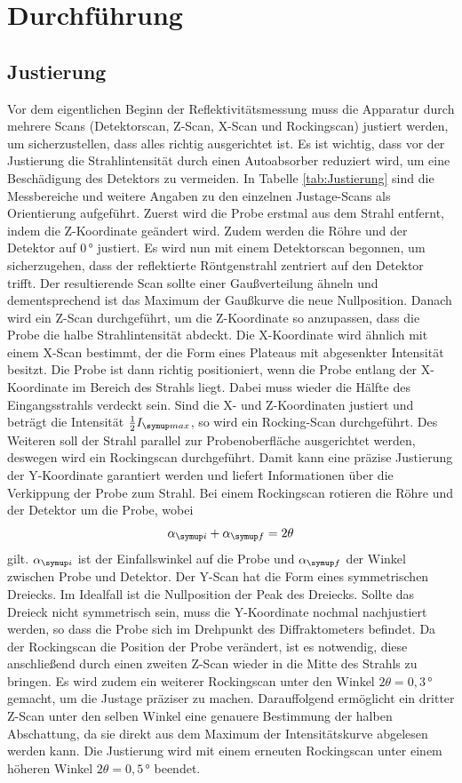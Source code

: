 \section{Durchführung}
\subsection{Justierung}
Vor dem eigentlichen Beginn der Reflektivitätsmessung muss die Apparatur durch mehrere Scans 
(Detektorscan, Z-Scan, X-Scan und Rockingscan) justiert werden, 
um sicherzustellen, dass alles richtig ausgerichtet ist.
Es ist wichtig, dass vor der Justierung die Strahlintensität durch einen Autoabsorber reduziert wird, um 
eine Beschädigung des Detektors zu vermeiden.
In Tabelle \ref{tab:Justierung} sind die Messbereiche und weitere Angaben zu den einzelnen Justage-Scans als Orientierung aufgeführt.
Zuerst wird die Probe erstmal aus dem Strahl entfernt, indem die Z-Koordinate geändert wird. Zudem werden die 
Röhre und der Detektor auf 0\,° justiert.
Es wird nun mit einem Detektorscan begonnen, um sicherzugehen, dass der reflektierte Röntgenstrahl zentriert auf den Detektor trifft.
Der resultierende Scan sollte einer Gaußverteilung ähneln und dementsprechend ist das Maximum der Gaußkurve die neue Nullposition.
Danach wird ein Z-Scan durchgeführt, um die Z-Koordinate so anzupassen, dass die Probe die halbe Strahlintensität abdeckt.
Die X-Koordinate wird ähnlich mit einem X-Scan bestimmt, der die Form eines Plateaus mit abgesenkter Intensität besitzt. 
Die Probe ist dann richtig positioniert, wenn die Probe entlang der X-Koordinate 
im Bereich des Strahls liegt. Dabei muss wieder die Hälfte des Eingangsstrahls verdeckt sein.
Sind die X- und Z-Koordinaten justiert und beträgt die Intensität $\frac{1}{2} I\idx{max}$, so wird ein Rocking-Scan durchgeführt.
Des Weiteren soll der Strahl parallel zur Probenoberfläche ausgerichtet werden, deswegen wird ein Rockingscan durchgeführt.
Damit kann eine präzise Justierung der Y-Koordinate garantiert werden und liefert Informationen über die Verkippung der Probe 
zum Strahl. Bei einem Rockingscan rotieren die Röhre und der Detektor um die Probe, wobei 
\begin{equation*}
  \alpha\idx{i} + \alpha\idx{f}= 2\theta
\end{equation*}
gilt. $\alpha\idx{i}$ ist der Einfallswinkel auf die Probe und $\alpha\idx{f}$ der Winkel zwischen Probe und Detektor. Der Y-Scan hat die Form eines symmetrischen Dreiecks. Im Idealfall ist die Nullposition der Peak des Dreiecks.
Sollte das Dreieck nicht symmetrisch sein, muss die Y-Koordinate nochmal nachjustiert werden, so dass die Probe sich im Drehpunkt 
des Diffraktometers befindet. Da der Rockingscan die Position der Probe verändert, 
ist es notwendig, diese anschließend durch einen zweiten Z-Scan wieder in die Mitte des Strahls zu bringen.
Es wird zudem ein weiterer Rockingscan unter den Winkel $2\theta=0,3\,°$ gemacht, um die Justage präziser zu machen.
Darauffolgend ermöglicht ein dritter Z-Scan unter den selben Winkel eine genauere Bestimmung der halben Abschattung, 
da sie direkt aus dem Maximum der Intensitätskurve abgelesen werden kann.
Die Justierung wird mit einem erneuten Rockingscan unter einem höheren Winkel $2\theta=0,5\,°$ beendet.

